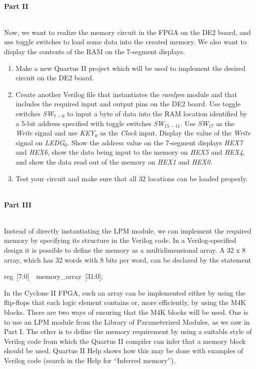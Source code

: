 \documentclass[psfig,10pt,fullpage]{article}
\begin{document}
~\\
\noindent
{\bf Part II}

~\\
\noindent
Now, we want to realize the memory circuit in the FPGA on the DE2 board, and 
use toggle switches to load some data into 
the created memory. We also want to display the contents of the RAM on the 7-segment displays.
\begin{enumerate}
\item Make a new Quartus II project which will be used to 
implement the desired circuit on the DE2 board.
\item Create another Verilog file that instantiates the {\it ramlpm} module and that
includes the required input and output pins on the DE2 board. 
Use toggle switches {\it SW}$_{7-0}$ to input a byte of
data into the RAM location identified by a 5-bit address specified with
toggle switches {\it SW}$_{15-11}$. Use {\it SW}$_{17}$ as the {\it Write} signal and
use {\it KEY}$_0$ as the {\it Clock} input. 
Display the value of the {\it Write} signal on {\it LEDG}$_0$. 
Show the address value on the 7-segment displays {\it HEX7} and {\it HEX6}, show the
data being input to the memory on {\it HEX5} and {\it HEX4}, and show the data read out
of the memory on {\it HEX1} and {\it HEX0}. 
\item Test your circuit and make sure that all 32 locations can be loaded properly.
\end{enumerate}

~\\
\noindent
{\bf Part III}

~\\
\noindent
Instead of directly instantiating the LPM module, we can implement the required memory by
specifying its structure in the Verilog code.
In a Verilog-specified design it is possible to define the memory as a
multidimensional array. A 32 {\sf x} 8 array, which has 32 words with
8 bits per word, can be declared by the statement

\begin{center}
reg~[7:0]~~memory\_array~[31:0];
\end{center}

\noindent
In the Cyclone II FPGA, such an array can be implemented either by using
the flip-flops that each logic element contains or, more efficiently, 
by using the M4K blocks.
There are two ways of ensuring that the M4K blocks will be used.
One is to use an LPM module from the Library of Parameterized Modules,
as we saw in Part I.
The other is to define the memory requirement by using a suitable style
of Verilog code from which the Quartus II compiler can infer that a memory
block should be used. Quartus II Help shows how this may be done with examples
of Verilog code (search in the Help for ``Inferred memory''). 
\end{document}
